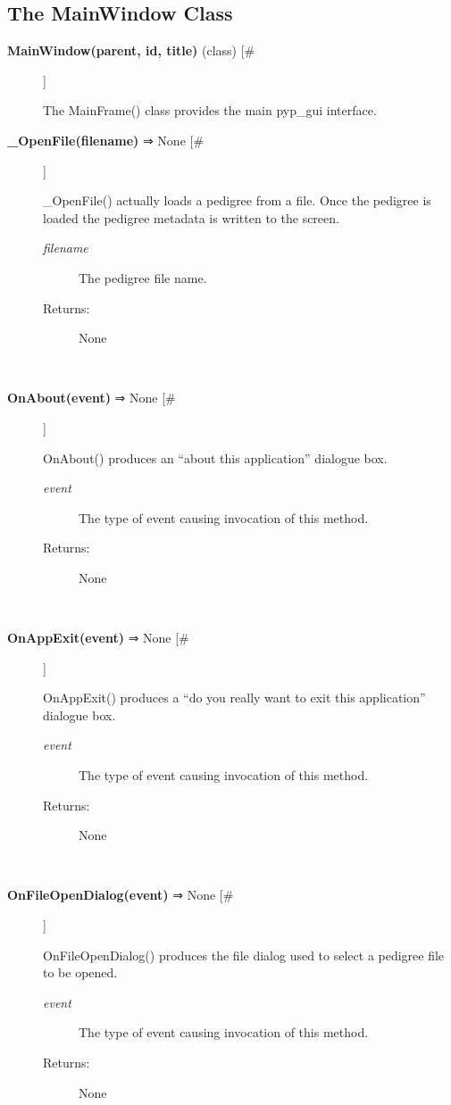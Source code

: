 \documentclass[10pt]{article}
\begin{document}
\subsection*{The MainWindow Class}
\begin{description}
\item[\textbf{MainWindow(parent, id, title)}
 (class) [\#]]

 The MainFrame() class provides the main pyp\_gui interface.

\item[\textbf{\_OpenFile(filename)}
 ⇒ None [\#]]

 \_OpenFile() actually loads a pedigree from a file. Once the pedigree is loaded the pedigree metadata is written to the screen.
\begin{description}
\item[\emph{filename}
] The pedigree file name.
\item[Returns:] None

\end{description}
\\ 

\item[\textbf{OnAbout(event)}
 ⇒ None [\#]]

 OnAbout() produces an ``about this application'' dialogue box.
\begin{description}
\item[\emph{event}
] The type of event causing invocation of this method.
\item[Returns:] None

\end{description}
\\ 

\item[\textbf{OnAppExit(event)}
 ⇒ None [\#]]

 OnAppExit() produces a ``do you really want to exit this application'' dialogue box.
\begin{description}
\item[\emph{event}
] The type of event causing invocation of this method.
\item[Returns:] None

\end{description}
\\ 

\item[\textbf{OnFileOpenDialog(event)}
 ⇒ None [\#]]

 OnFileOpenDialog() produces the file dialog used to select a pedigree file to be opened.
\begin{description}
\item[\emph{event}
] The type of event causing invocation of this method.
\item[Returns:] None


\end{description}
\end{description}
\end{document}
